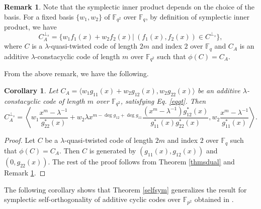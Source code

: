 \documentclass[12 pt]{extarticle}
\numberwithin{equation}{section}
\newtheorem{corollary}[theorem]{Corollary}
\theoremstyle{definition}
\newtheorem{remark}{Remark}[section]
\begin{document}
\begin{remark}\label{eqsym}
    Note that the symplectic inner product depends on the choice of the basis. For a fixed basis $\{w_1,w_2\}$ of $\mathbb{F}_{q^2}$ over $\mathbb{F}_q$, by definition of symplectic inner product, we have $$C_A^{\perp_s}=\{w_1f_1(x)+w_2f_2(x)|\ (f_1(x),f_2(x))\in C^{\perp_s}\},$$
where $C$ is a $\lambda$-quasi-twisted code of length $2m$ and index $2$ over $\mathbb{F}_q$ and $C_A$ is an additive $\lambda$-constacyclic code of length $m$ over $\mathbb{F}_{q^2}$ such that  $\phi(C)=C_A$.   
\end{remark}

From the above remark, we have the following.

\begin{corollary}
    Let $C_A=\langle w_1g_{11}(x)+w_2g_{12}(x),w_2g_{22}(x)\rangle$ be an additive $\lambda$-constacyclic code of length $m$ over $\mathbb{F}_{q^2}$,  satisfying Eq. \ref{eqqt}. Then
    $$C_A^{\perp_s}=\left \langle w_1\frac{x^m-\lambda^{-1}}{g_{22}^*(x)}+w_2 \lambda x^{m-\deg g_{12}+\deg g_{11}}\frac{(x^m-\lambda^{-1})g_{12}^*(x)}{g_{11}^*(x)g_{22}^*(x)}, w_2\frac{x^m-\lambda^{-1}}{g_{11}^*(x)}\right \rangle.$$
\end{corollary}
\begin{proof}
    Let $C$ be a $\lambda$-quasi-twisted code of length $2m$ and index $2$ over $\mathbb{F}_q$ such that $\phi(C)=C_A$. Then $C$ is generated by $(g_{11}(x),g_{12}(x))$ and $(0,g_{22}(x))$. The rest of the proof follows from Theorem \ref{thmsdual} and Remark \ref{eqsym}.
\end{proof}
The following corollary shows that Theorem \ref{selfsym} generalizes the result for symplectic self-orthogonality of additive cyclic codes over $\mathbb{F}_{p^2}$ obtained in \cite[Theorem 4.2]{reza2025}.  
\end{document}
